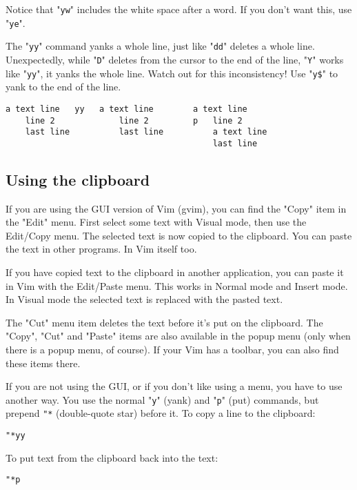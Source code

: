 Notice that "\verb!yw!" includes the white space after a word.
If you don't want this, use "\verb!ye!".

The "\verb!yy!" command yanks a whole line, just like "\verb!dd!" deletes a whole line.
Unexpectedly, while "\verb!D!" deletes from the cursor to the end of the line, "\verb!Y!" works like "\verb!yy!", it yanks the whole line.
Watch out for this inconsistency!  Use "\verb!y$!" to yank to the end of the line.

		\begin{Verbatim}[samepage=true]
    a text line   yy   a text line        a text line
    line 2             line 2         p   line 2
    last line          last line          a text line
                                          last line
		\end{Verbatim}

\subsection{Using the clipboard}
\label{Using the clipboard}

If you are using the GUI version of Vim (gvim), you can find the "Copy" item in the "Edit" menu.
First select some text with Visual mode, then use the Edit/Copy menu.
The selected text is now copied to the clipboard.
You can paste the text in other programs.
In Vim itself too.

If you have copied text to the clipboard in another application, you can paste it in Vim with the Edit/Paste menu.
This works in Normal mode and Insert mode.
In Visual mode the selected text is replaced with the pasted text.

The "Cut" menu item deletes the text before it's put on the clipboard.
The "Copy", "Cut" and "Paste" items are also available in the popup menu (only when there is a popup menu, of course).
If your Vim has a toolbar, you can also find these items there.

If you are not using the GUI, or if you don't like using a menu, you have to use another way.
You use the normal "\verb!y!" (yank) and "\verb!p!" (put) commands, but prepend \verb!"*! (double-quote star) before it.
To copy a line to the clipboard:

 \begin{Verbatim}[samepage=true]
 "*yy
 \end{Verbatim}

To put text from the clipboard back into the text:

 \begin{Verbatim}[samepage=true]
 "*p
 \end{Verbatim}

